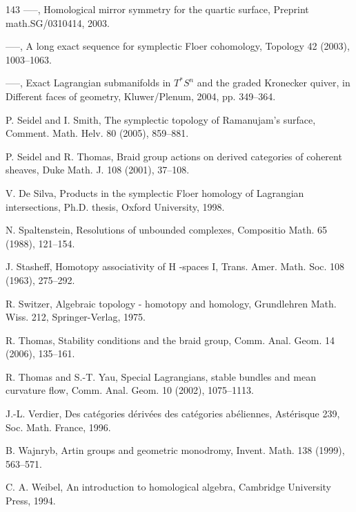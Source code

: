 \begin{thebibliography}{143}
 —–, Homological mirror symmetry for the quartic surface, Preprint math.SG/0310414, 2003.

 —–, A long exact sequence for symplectic Floer cohomology, Topology 42 (2003), 1003–1063.

 —–, Exact Lagrangian submanifolds in \(T^*S^n\) and the graded Kronecker quiver, in Different faces of geometry, Kluwer/Plenum, 2004, pp. 349–364.

 P. Seidel and I. Smith, The symplectic topology of Ramanujam’s surface, Comment. Math. Helv. 80 (2005), 859–881.

 P. Seidel and R. Thomas, Braid group actions on derived categories of coherent sheaves, Duke Math. J. 108 (2001), 37–108.

 V. De Silva, Products in the symplectic Floer homology of Lagrangian intersections, Ph.D. thesis, Oxford University, 1998.

 N. Spaltenstein, Resolutions of unbounded complexes, Compositio Math. 65 (1988), 121–154.

 J. Stasheff, Homotopy associativity of H -spaces I, Trans. Amer. Math. Soc. 108 (1963), 275–292.

 R. Switzer, Algebraic topology - homotopy and homology, Grundlehren Math. Wiss. 212, Springer-Verlag, 1975.

 R. Thomas, Stability conditions and the braid group, Comm. Anal. Geom. 14 (2006), 135–161.

 R. Thomas and S.-T. Yau, Special Lagrangians, stable bundles and mean curvature flow, Comm. Anal. Geom. 10 (2002), 1075–1113.

 J.-L. Verdier, Des catégories dérivées des catégories abéliennes, Astérisque 239, Soc. Math. France, 1996.

 B. Wajnryb, Artin groups and geometric monodromy, Invent. Math. 138 (1999), 563–571.

 C. A. Weibel, An introduction to homological algebra, Cambridge University Press, 1994.

\end{thebibliography}
